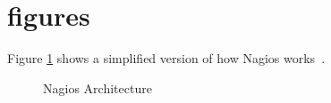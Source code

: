 \documentclass[9pt,twocolumn,twoside]{styles/osajnl}
\begin{document}


 

\appendix 
\section{figures}
Figure \ref{fig:Nagios-architecture} shows a simplified version of how Nagios works~\cite{nagios-book}.

\begin{figure}[htbp]
\centering
{}
\caption{Nagios Architecture}
\label{fig:Nagios-architecture}
\end{figure}

\appendix
\end{document}
